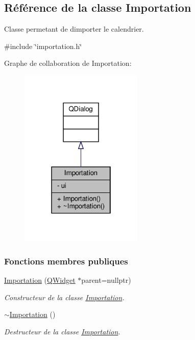\hypertarget{class_importation}{}\subsection{Référence de la classe Importation}
\label{class_importation}


Classe permetant de d\textquotesingle{}importer le calendrier.  




{\ttfamily \#include \char`\"{}importation.\+h\char`\"{}}



Graphe de collaboration de Importation\+:
\nopagebreak
\begin{figure}[H]
\begin{center}
\leavevmode
\includegraphics[width=166pt]{class_importation__coll__graph}
\end{center}
\end{figure}
\subsubsection*{Fonctions membres publiques}
\begin{DoxyCompactItemize}
\item 
\hyperlink{class_importation_ad3a625fb90d559ff048151a4cb4646b4}{Importation} (\hyperlink{class_q_widget}{Q\+Widget} $\ast$parent=nullptr)
\begin{DoxyCompactList}\small\item\em Constructeur de la classe \hyperlink{class_importation}{Importation}. \end{DoxyCompactList}\item 
\hyperlink{class_importation_ac9f6f0a390369d5732576fb38a8e62c7}{$\sim$\+Importation} ()
\begin{DoxyCompactList}\small\item\em Destructeur de la classe \hyperlink{class_importation}{Importation}. \end{DoxyCompactList}\end{DoxyCompactItemize}
